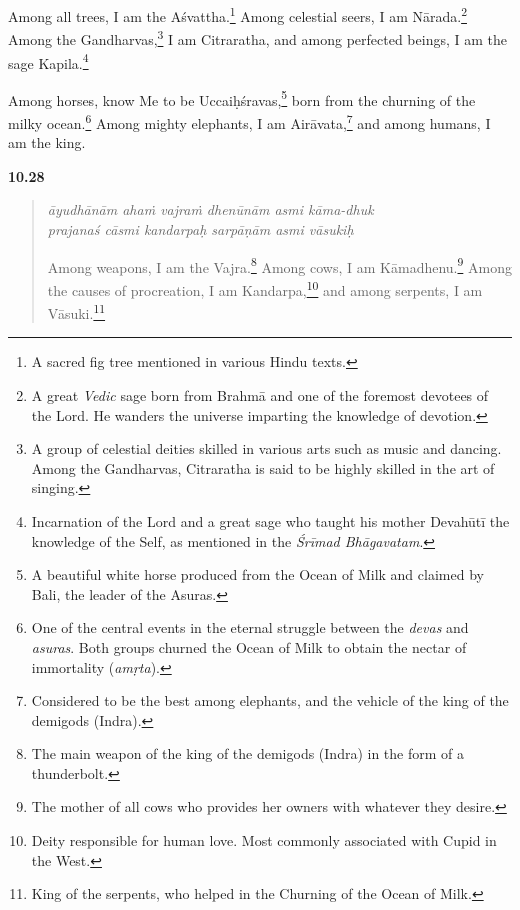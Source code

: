 {Among all trees, I am the Aśvattha.\footnote{A sacred fig tree mentioned in various Hindu texts.} Among celestial seers, I am Nārada.\footnote{A great \textit{Vedic} sage born from Brahmā and one of the foremost devotees of the Lord. He wanders the universe imparting the knowledge of devotion.} Among the Gandharvas,\footnote{A group of celestial deities skilled in various arts such as music and dancing. Among the Gandharvas, Citraratha is said to be highly skilled in the art of singing.} I am Citraratha, and among perfected beings, I am the sage Kapila.\footnote{Incarnation of the Lord and a great sage who taught his mother Devahūtī the knowledge of the Self, as mentioned in the \textit{Śrīmad Bhāgavatam}.}}

{Among horses, know Me to be Uccaiḥśravas,\footnote{A beautiful white horse produced from the Ocean of Milk and claimed by Bali, the leader of the Asuras.} born from the churning of the milky ocean.\footnote{One of the central events in the eternal struggle between the \textit{devas} and \textit{asuras}. Both groups churned the Ocean of Milk to obtain the nectar of immortality (\textit{amṛta}).} Among mighty elephants, I am Airāvata,\footnote{Considered to be the best among elephants, and the vehicle of the king of the demigods (Indra).} and among humans, I am the king.}


\par\noindent\textbf{10.28}\par
\begin{verse}
\textit{āyudhānām ahaṁ vajraṁ dhenūnām asmi kāma-dhuk} \\
\textit{prajanaś cāsmi kandarpaḥ sarpāṇām asmi vāsukiḥ}

\noindent Among weapons, I am the Vajra.\footnote{The main weapon of the king of the demigods (Indra) in the form of a thunderbolt.} Among cows, I am Kāmadhenu.\footnote{The mother of all cows who provides her owners with whatever they desire.} Among the causes of procreation, I am Kandarpa,\footnote{Deity responsible for human love. Most commonly associated with Cupid in the West.} and among serpents, I am Vāsuki.\footnote{King of the serpents, who helped in the Churning of the Ocean of Milk.}
\end{verse}
\par



